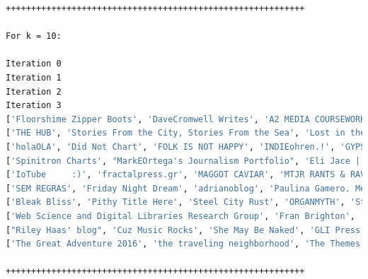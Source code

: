 \documentclass[a4paper, 11pt]{article}
\begin{document}
\begin{lstlisting}[language=bash, breakatwhitespace=〈false), label=Running kclust.py, caption=Running kclust.py]
+++++++++++++++++++++++++++++++++++++++++++++++++++++++++++

For k = 10:

Iteration 0
Iteration 1
Iteration 2
Iteration 3
['Floorshime Zipper Boots', 'DaveCromwell Writes', 'A2 MEDIA COURSEWORK JOINT BLOG', 'Advanced Portfolio - Josh Pamfilo - Candidate Number 2186 - Centre Number 16607 - A2 Media Studies']
['THE HUB', 'Stories From the City, Stories From the Sea', 'Lost in the Shuffle', 'music of the moment', 'Playing Favorites', 'My Name Is Blue Canary', 'Tremagazine', 'Myopiamuse']
['holaOLA', 'Did Not Chart', 'FOLK IS NOT HAPPY', 'INDIEohren.!', 'GYPSY RHAPSODY', 'Everything Starts With an A...', 'A layer of chips', 'Some Call It Noise....', 'The Music Binge', 'Jasmine Hodge', 'The Stark Online', 'Encore']
['Spinitron Charts', "MarkEOrtega's Journalism Portfolio", 'Eli Jace | The Mind Is A Terrible Thing To Paste', 'If You Give a Girl a Camera...', 'The Campus Buzz on WSOU']
['IoTube     :)', 'fractalpress.gr', 'MAGGOT CAVIAR', 'MTJR RANTS & RAVES ON MUSIC', '~ mavaffantastico ~', '*Sixeyes: by Alan Williamson', 'F-Measure', "MarkFisher's-MusicReview"]
['SEM REGRAS', 'Friday Night Dream', 'adrianoblog', 'Paulina Gamero. Media Studies A2', 'Who needs a TV?', 'Out of my Mind']
['Bleak Bliss', 'Pithy Title Here', 'Steel City Rust', 'ORGANMYTH', 'Stonehill Sketchbook', 'a duchess nonethelesss', 'nonsense a la mode', 'Music-Drop Magazine', "i'm in too truthful a mood", 'Beyond the pond', 'macthemost', 'Mile In Mine', 'KiDCHAIR', 'LOST  PLACES', 'sweeping the kitchen', 'One Stunning Single Egg', "She's mad but she's magic. There's no lie in her fire."]
['Web Science and Digital Libraries Research Group', 'Fran Brighton', 'Angie Dynamo', 'Bonjour Girl', "Pirate's Log", 'Boggle Me Thursday', 'The Ideal Copy', 'I/LOVE/TOTAL/DESTRUCTION', "It'll Glow On You", 'Cast Iron Songs']
["Riley Haas' blog", 'Cuz Music Rocks', 'She May Be Naked', 'GLI Press', 'Stephanie Veto Photography', 'Chantelle Swain A2 Media Studies', 'jaaackie.', 'Happy Accidents', '@65 Sounding Booth', 'from a voice plantation', 'bittersweet', 'A Day in the Life of...Me!!', 'Rants from the Pants', 'STATUS', 'Cherry Area', 'Make Up, Music & Fashion', 'simone goes']
['The Great Adventure 2016', 'the traveling neighborhood', 'The Themes of My Life', 'Sonology', 'Hip In Detroit', 'Revolver USA Distribution & Midheaven mailorder', 'guardtheguardians']

+++++++++++++++++++++++++++++++++++++++++++++++++++++++++++


\end{lstlisting}
\end{document}
